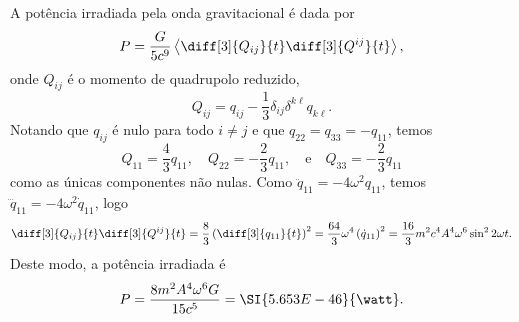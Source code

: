 A potência irradiada pela onda gravitacional é dada por
\begin{equation*}
    P = \frac{G}{5c^9} \left\langle \diff[3]{Q_{ij}}{t}\diff[3]{Q^{ij}}{t}\right\rangle,
\end{equation*}
onde \(Q_{ij}\) é o momento de quadrupolo reduzido,
\begin{equation*}
    Q_{ij} = q_{ij} - \frac13 \delta_{ij} \delta^{k\ell} q_{k\ell}.
\end{equation*}
Notando que \(q_{ij}\) é nulo para todo \(i \neq j\) e que \(q_{22} = q_{33} = -q_{11}\), temos
\begin{equation*}
    Q_{11} = \frac43 q_{11}, \quad Q_{22} = - \frac23 q_{11}, \quad\text{e}\quad Q_{33} = -\frac23 q_{11}
\end{equation*}
como as únicas componentes não nulas. Como \(\ddot{q}_{11}= - 4\omega^2q_{11}\), temos \(\dddot{q}_{11} = -4 \omega^2 \dot{q}_{11}\), logo
\begin{equation*}
    \diff[3]{Q_{ij}}{t}\diff[3]{Q^{ij}}{t} = \frac83 \left(\diff[3]{q_{11}}{t}\right)^2 = \frac{64}{3} \omega^4 \left(\dot{q}_{11}\right)^2 = \frac{16}{3} m^2c^4 A^4 \omega^6 \sin^2 2\omega t.
\end{equation*}
Deste modo, a potência irradiada é
\begin{equation*}
    P = \frac{8m^2 A^4 \omega^6 G}{15c^5} = \SI{5.653E-46}{\watt}.
\end{equation*}
